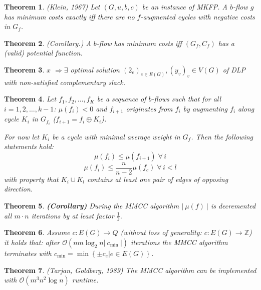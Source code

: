 \documentclass{article}
\newtheorem{theorem}{Theorem}
\newcommand{\card}[1]{\left|\:\!#1\:\!\right|}
\newcommand{\set}[1]{\left\{#1\right\}}
\newcommand{\fall}{\;\forall\,}
\begin{document}
\begin{theorem}\label{satz-5.3}
  (Klein, 1967)
  Let $(G, u, b, c)$ be an instance of MKFP. A $b$-flow $g$ has minimum costs exactly iff there are no $f$-augmented cycles with negative costs in $G_f$.
\end{theorem}
\begin{theorem}
  (Corollary.)
  A $b$-flow has minimum costs iff $(G_f, C_f)$ has a (valid) potential function.
\end{theorem}
  \begin{theorem}
    $x$  $\Rightarrow \exists$ optimal solution $(2_e)_{e \in E(G)}, (y_v)_v \in V(G)$
    of DLP with non-satisfied complementary slack.
  \end{theorem}
\begin{theorem}\label{lemma-5.5}
  Let $f_1, f_2, \ldots, f_K$ be a sequence of $b$-flows such that for all $i = 1, 2, \ldots, k-1$:
  $\mu(f_i) < 0$  and $f_{i+1}$ originates from $f_i$ by augmenting $f_i$ along cycle $K_i$ in $G_{f_i}$ ($f_{i+1} = f_i \oplus K_i$).

  For now let $K_i$ be a cycle with minimal average weight in $G_f$. Then the following statements hold:
  \[ \mu(f_i) \leq \mu(f_{i+1}) \fall i \]
  \[ \mu(f_i) \leq \frac{n}{n-2} \mu(f_c) \fall i < l \]
  with property that $K_i \cup K_l$ contains at least one pair of edges of opposing direction.
\end{theorem}
  \begin{theorem}
    \textbf{(Corollary)}
    During the MMCC algorithm $\card{\mu(f)}$ is decremented all $m\cdot n$ iterations by at least factor $\frac12$.
  \end{theorem}
\begin{theorem}\label{proposition-5.6}
  Assume $c: E(G) \rightarrow Q$ (without loss of generality: $c: E(G) \rightarrow \mathbb{Z}$) it holds that:
  after $\mathcal{O}(nm \log_2{n} \card{c_{\text{min}}})$ iterations the MMCC algorithm terminates with
  $c_{\text{min}} = \min\set{\pm c_e | e \in E(G)}$.
\end{theorem}
\begin{theorem}\label{satz-5.7}
  (Tarjan, Goldberg, 1989)
  The MMCC algorithm can be implemented with $\mathcal{O}(m^3 n^2 \log{n})$ runtime.
\end{theorem}
\end{document}
